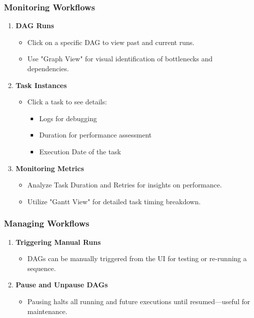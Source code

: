 \documentclass[aspectratio=169]{beamer}
\begin{document}
\begin{frame}[fragile]
    \frametitle{Monitoring Workflows}
    \begin{enumerate}
        \item \textbf{DAG Runs}
            \begin{itemize}
                \item Click on a specific DAG to view past and current runs.
                \item Use "Graph View" for visual identification of bottlenecks and dependencies.
            \end{itemize}
        \item \textbf{Task Instances}
            \begin{itemize}
                \item Click a task to see details:
                \begin{itemize}
                    \item Logs for debugging
                    \item Duration for performance assessment
                    \item Execution Date of the task
                \end{itemize}
            \end{itemize}
        \item \textbf{Monitoring Metrics}
            \begin{itemize}
                \item Analyze Task Duration and Retries for insights on performance.
                \item Utilize "Gantt View" for detailed task timing breakdown.
            \end{itemize}
    \end{enumerate}
\end{frame}

\begin{frame}[fragile]
    \frametitle{Managing Workflows}
    \begin{enumerate}
        \item \textbf{Triggering Manual Runs}
            \begin{itemize}
                \item DAGs can be manually triggered from the UI for testing or re-running a sequence.
            \end{itemize}
        \item \textbf{Pause and Unpause DAGs}
            \begin{itemize}
                \item Pausing halts all running and future executions until resumed—useful for maintenance.
            \end{itemize}
    \end{enumerate}
\end{frame}
\end{document}
